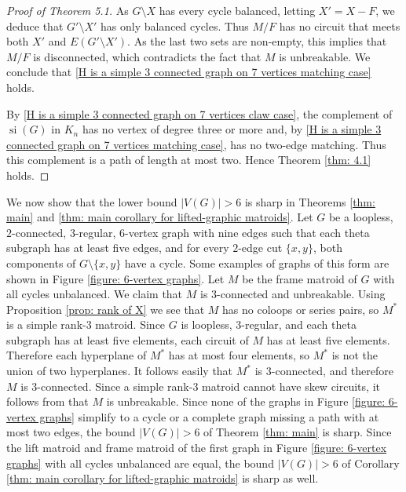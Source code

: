 \documentclass[12pt]{article}
\theoremstyle{definition}
\theoremstyle{plain} %
\DeclareMathOperator{\si}{si}
\newcommand{\del}{\!\setminus\!}
\begin{document}
\begin{proof}[Proof of Theorem 5.1]
As $G\del X$ has every cycle balanced, letting $X'=X-F$, we deduce that $G'\del X'$ has only balanced cycles. Thus $M/F$ has no circuit that meets both $X'$ and $E(G'\del X')$. As the last two sets are non-empty, this implies that $M/F$ is disconnected, which contradicts the fact that $M$ is unbreakable. We conclude that \ref{H is a simple 3 connected graph on 7 vertices matching case} holds.

By \ref{H is a simple 3 connected graph on 7 vertices claw case}, the complement of $\si(G)$ in $K_n$ has no vertex of degree three or more and, by \ref{H is a simple 3 connected graph on 7 vertices matching case}, has no two-edge matching. Thus this complement is a path of length at most two. Hence Theorem \ref{thm: 4.1} holds.
\end{proof}





We now show that the lower bound $|V(G)| > 6$ is sharp in Theorems \ref{thm: main} and \ref{thm: main corollary for lifted-graphic matroids}.
Let $G$ be a loopless, $2$-connected, $3$-regular, $6$-vertex graph with nine edges such that each theta subgraph has at least five edges, and for every $2$-edge cut $\{x,y\}$, both components of $G \del \{x,y\}$ have a cycle.
Some examples of graphs of this form are shown in Figure \ref{figure: 6-vertex graphs}.
Let $M$ be the frame matroid of $G$ with all cycles unbalanced.
We claim that $M$ is $3$-connected and unbreakable.
Using Proposition \ref{prop: rank of X} we see that $M$ has no coloops or series pairs, so $M^*$ is a simple rank-$3$ matroid.
Since $G$ is loopless, $3$-regular, and each theta subgraph has at least five elements, each circuit of $M$ has at least five elements. 
Therefore each hyperplane of $M^*$ has at most four elements, so $M^*$ is not the union of two hyperplanes.
It follows easily that $M^*$ is $3$-connected, and therefore $M$ is $3$-connected.
Since a simple rank-$3$ matroid cannot have skew circuits, it follows from \cite[Theorem 1.1]{Oxley-Pfeil2022} that $M$ is unbreakable.
Since none of the graphs in Figure \ref{figure: 6-vertex graphs} simplify to a cycle or a complete graph missing a path with at most two edges, the bound $|V(G)| > 6$ of Theorem \ref{thm: main} is sharp.
Since the lift matroid and frame matroid of the first graph in Figure \ref{figure: 6-vertex graphs} with all cycles unbalanced are equal, the bound $|V(G)| > 6$ of Corollary \ref{thm: main corollary for lifted-graphic matroids} is sharp as well.
\end{document}
